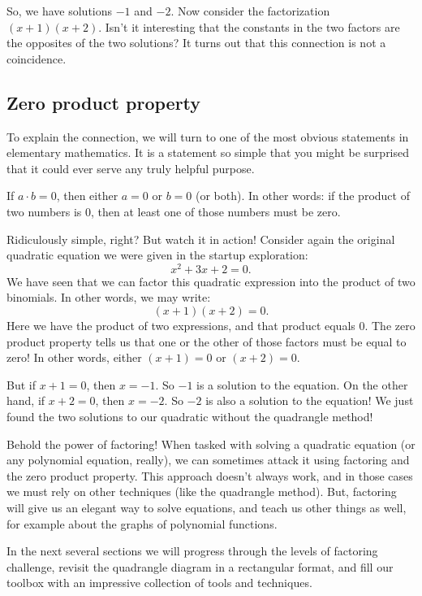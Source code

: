 So, we have solutions $-1$ and $-2$. Now consider the factorization $(x+1)(x+2)$. Isn't it interesting that the constants in the two factors are the opposites of the two solutions? It turns out that this connection is not a coincidence.

\subsection{Zero product property}

To explain the connection, we will turn to one of the most obvious statements in elementary mathematics. It is a statement so simple that you might be surprised that it could ever serve any truly helpful purpose.

\begin{boxdef}
If $a \cdot b = 0$, then either $a=0$ or $b=0$ (or both). In other words: if the product of two numbers is 0, then at least one of those numbers must be zero.
\end{boxdef}

Ridiculously simple, right? But watch it in action! Consider again the original quadratic equation we were given in the startup exploration:
\[x^2 + 3x + 2 = 0.\]
We have seen that we can factor this quadratic expression into the product of two binomials. In other words, we may write:
\[(x+1)(x+2) = 0.\]
Here we have the product of two expressions, and that product equals 0. The zero product property tells us that one or the other of those factors must be equal to zero! In other words, either $(x+1) = 0$ or $(x+2)=0$.

But if $x+1=0$, then $x=-1$. So $-1$ is a solution to the equation. On the other hand, if $x+2=0$, then $x=-2$. So $-2$ is also a solution to the equation! We just found the two solutions to our quadratic without the quadrangle method!

Behold the power of factoring! When tasked with solving a quadratic equation (or any polynomial equation, really), we can sometimes attack it using factoring and the zero product property. This approach doesn't always work, and in those cases we must rely on other techniques (like the quadrangle method). But, factoring will give us an elegant way to solve equations, and teach us other things as well, for example about the graphs of polynomial functions.

In the next several sections we will progress through the levels of factoring challenge, revisit the quadrangle diagram in a rectangular format, and fill our toolbox with an impressive collection of tools and techniques.

